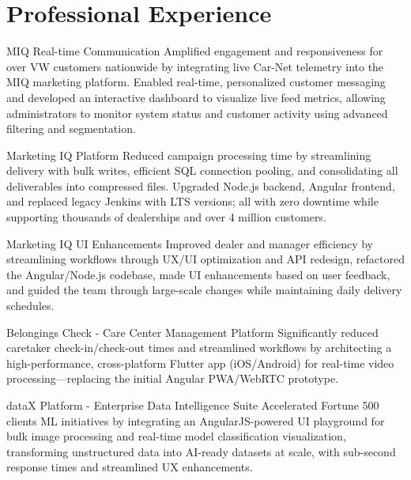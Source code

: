 \section{Professional Experience}

\begin{sectionContainer}
	{MIQ Real-time Communication} {Amplified engagement and responsiveness} {for over VW customers nationwide by integrating live Car-Net telemetry into the MIQ marketing platform. Enabled real-time, personalized customer messaging and developed an interactive dashboard to visualize live feed metrics, allowing administrators to monitor system status and customer activity using advanced filtering and segmentation.}
\end{sectionContainer}

\begin{sectionContainer}
	{Marketing IQ Platform} {Reduced campaign processing time} {by streamlining delivery with bulk writes, efficient SQL connection pooling, and consolidating all deliverables into compressed files. Upgraded Node.js backend, Angular frontend, and replaced legacy Jenkins with LTS versions; all with zero downtime while supporting thousands of dealerships and over 4 million customers.}
\end{sectionContainer}

\begin{sectionContainer}
	{Marketing IQ UI Enhancements} {Improved dealer and manager efficiency} {by streamlining workflows through UX/UI optimization and API redesign, refactored the Angular/Node.js codebase, made UI enhancements based on user feedback, and guided the team through large-scale changes while maintaining daily delivery schedules.}
\end{sectionContainer}


\begin{sectionContainer}
	{Belongings Check - Care Center Management Platform} {Significantly reduced caretaker check-in/check-out times} {and streamlined workflows by architecting a high-performance, cross-platform Flutter app (iOS/Android) for real-time video processing—replacing the initial Angular PWA/WebRTC prototype.}
\end{sectionContainer}

\begin{sectionContainer}
	{dataX Platform - Enterprise Data Intelligence Suite} {Accelerated Fortune 500 clients ML initiatives} {by integrating an AngularJS-powered UI playground for bulk image processing and real-time model classification visualization, transforming unstructured data into AI-ready datasets at scale, with sub-second response times and streamlined UX enhancements.}
\end{sectionContainer}

